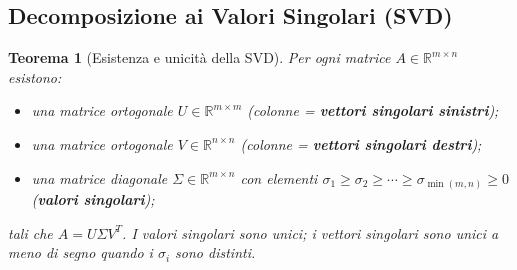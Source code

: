 \documentclass[11pt,a4paper]{article}
\theoremstyle{plain}
\newtheorem{teorema}{Teorema}[section]
\theoremstyle{definition}
\theoremstyle{remark}
\begin{document}
\subsection{Decomposizione ai Valori Singolari (SVD)}

\begin{teorema}[Esistenza e unicità della SVD]
\label{thm:svd}
Per ogni matrice $A \in \mathbb{R}^{m \times n}$ esistono:
\begin{itemize}
  \item una matrice ortogonale $U \in \mathbb{R}^{m \times m}$ (colonne = \textbf{vettori singolari sinistri});
  \item una matrice ortogonale $V \in \mathbb{R}^{n \times n}$ (colonne = \textbf{vettori singolari destri});
  \item una matrice diagonale $\Sigma \in \mathbb{R}^{m \times n}$ con elementi
        $\sigma_1 \geq \sigma_2 \geq \cdots \geq \sigma_{\min(m,n)} \geq 0$
        (\textbf{valori singolari});
\end{itemize}
tali che $A = U \Sigma V^T$. I valori singolari sono unici; i vettori singolari
sono unici a meno di segno quando i $\sigma_i$ sono distinti.
\end{teorema}
\end{document}
